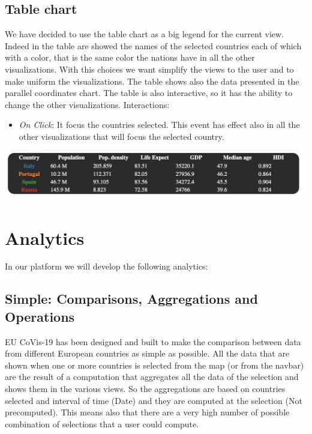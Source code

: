 \documentclass[10pt,conference]{IEEEtran}
\begin{document}
\subsection{Table chart}
We have decided to use the table chart as a big legend for the current view. Indeed in the table are showed the names of the selected countries each of which with a color, that is the same color the nations have in all the other visualizations. With this choices we want simplify the views to the user and to make uniform the visualizations.
The table shows also the data presented in the parallel coordinates chart. The table is also interactive, so it has the ability to change the other visualizations.
Interactions:
\begin{itemize}
	\item {\em On Click}: It focus the countries selected. This event has effect also in all the other visualizations that will focus the selected country.
\end{itemize}

\begin{center}
    \includegraphics[width=1\linewidth]{img/table.png} 
\end{center}

\section{Analytics}
In our platform we will develop the following analytics:
\subsection{Simple: Comparisons, Aggregations and Operations} 
EU CoVis-19 has been designed and built to make the comparison between data from different European countries as simple as possible. All the data that are shown when one or more countries is selected from the map (or from the navbar) are the result of a computation that aggregates all the data of the selection and shows them in the various views.
So the aggregations are based on countries selected and interval of time (Date) and they are computed at the selection (Not precomputed). This means also that there are a very high number of possible combination of selections that a user could compute. 
\end{document}
